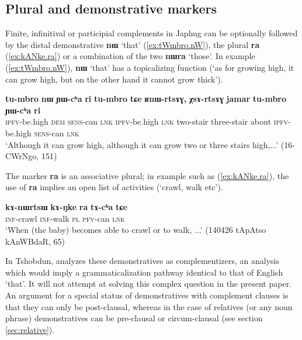 \documentclass[oneside,a4paper,11pt]{article}
\newcommand{\ipa}[1]{\textbf{\phon#1}} %
\newcommand{\jpg}[2]{\ipa{#1} `#2'} %
\begin{document}
 \subsection{Plural and demonstrative markers} \label{sec:demonstratives}
Finite, infinitival or participial complements in Japhug can be optionally followed by the distal demonstrative \jpg{nɯ}{that} (\ref{ex:tWmbro.nW}), the plural \ipa{ra} (\ref{ex:kANke.ra}) or a combination of the two \jpg{nɯra}{those}. In example (\ref{ex:tWmbro.nW}), \jpg{nɯ}{that}  has a topicalizing function (`as for growing high, it can grow high, but on the other hand it cannot grow thick').

 \begin{exe}
\ex \label{ex:tWmbro.nW}
\gll 
\ipa{tu-mbro} 	\ipa{nɯ} 	\ipa{ɲɯ-cʰa} 	\ipa{ri} 	\ipa{tu-mbro} 	\ipa{tɕe} 	\ipa{ʁnɯ-rtsɤɣ,} 	\ipa{χsɤ-rtsɤɣ} 	\ipa{jamar} 	\ipa{tu-mbro} 	\ipa{ɲɯ-cʰa} 	\ipa{ri}  \\
\textsc{ipfv}-be.high \textsc{dem} \textsc{sens}-can \textsc{lnk} \textsc{ipfv}-be.high \textsc{lnk} two-stair three-stair about \textsc{ipfv}-be.high  \textsc{sens}-can \textsc{lnk} \\
\glt `Although it can grow high, although it can grow two or three stairs high,...' (16-CWrNgo, 151)
\end{exe}
 
The marker \ipa{ra} is an associative plural; in example such as (\ref{ex:kANke.ra}), the use of \ipa{ra} implies an open list of activities (`crawl, walk etc'). 
 
 \begin{exe}
\ex \label{ex:kANke.ra}
\gll   \ipa{kɤ-nɯrtsɯ} 	\ipa{kɤ-ŋke} 	\ipa{ra} 	\ipa{tɤ-cʰa} 	\ipa{tɕe}   \\
  \textsc{inf}-crawl   \textsc{inf}-walk \textsc{pl} \textsc{pfv}-can \textsc{lnk} \\
\glt `When (the baby) becomes able to crawl or to walk, ...'  (140426 tApAtso kAnWBdaR, 65)
\end{exe}

In Tshobdun, \citet[481]{sun12complementation} analyzes these demonstratives as complementizers, an analysis which would imply a grammaticalization pathway identical to that of English `that'. It will not attempt  at solving this complex question in the present paper. An argument for a special status of demonstratives with complement clauses is that they can only be post-clausal, whereas in the case of relatives (or any noun phrase) demonstratives can be pre-clausal or circum-clausal (see section \ref{sec:relative}).
\end{document}
